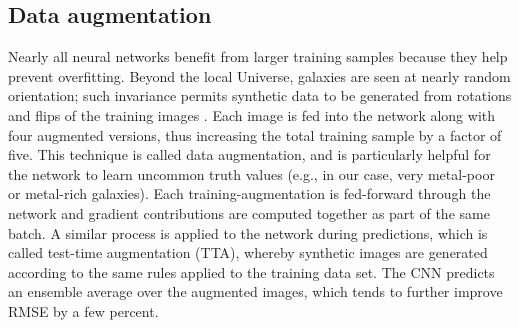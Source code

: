 \documentclass[fleqn,usenatbib]{mnras}
\begin{document}
\subsection{Data augmentation}
Nearly all neural networks benefit from larger training samples because they help prevent overfitting.
Beyond the local Universe, galaxies are seen at nearly random orientation; such invariance permits synthetic data to be generated from rotations and flips of the training images \citep[see, e.g.,][]{2014arXiv1409.1556S}.
Each image is fed into the network along with four augmented versions, thus increasing the total training sample by a factor of five.
This technique is called data augmentation, and is particularly helpful for the network to learn uncommon truth values (e.g., in our case, very metal-poor or metal-rich galaxies).
Each training-augmentation is fed-forward through the network and gradient contributions are computed together as part of the same batch.
A similar process is applied to the network during predictions, which is called test-time augmentation (TTA), whereby synthetic images are generated according to the same rules applied to the training data set.
The CNN predicts an ensemble average over the augmented images, which tends to further improve RMSE by a few percent.
\end{document}

